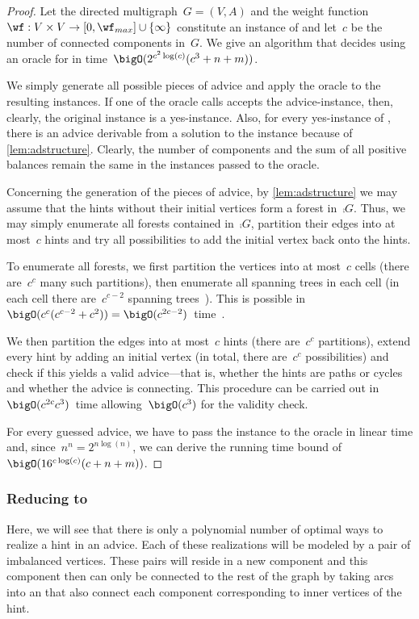 \begin{proof}
  Let the directed multigraph~$G=(V,A)$ and the weight function~$\wf: V \times V \rightarrow [0, \wf_{max}]\cup \{\infty\}$ constitute an instance of \pWMEEs{} and let~$c$ be the number of connected components in~$G$. We give an algorithm that decides \pWMEEs{} using an oracle for \pWMEECAs{} in time~$\bigO(2^{c^2\log(c)}(c^3 + n + m))$.

We simply generate all possible pieces of advice and apply the oracle to the resulting instances. If one of the oracle calls accepts the advice-instance, then, clearly, the original instance is a yes-instance. Also, for every yes-instance of \pWMEEs{}, there is an advice derivable from a solution to the instance because of \autoref{lem:adstructure}. Clearly, the number of components and the sum of all positive balances remain the same in the instances passed to the oracle.

Concerning the generation of the pieces of advice, by \autoref{lem:adstructure} we may assume that the hints without their initial vertices form a forest in~$\comp{G}$. Thus, we may simply enumerate all forests contained in~$\comp{G}$, partition their edges into at most~$c$ hints and try all possibilities to add the initial vertex back onto the hints.

To enumerate all forests, we first partition the vertices into at most~$c$ cells (there are~$c^c$ many such partitions), then enumerate all spanning trees in each cell (in each cell there are~$c^{c-2}$ spanning trees~\cite{Cay89}). This is possible in~$\bigO(c^c(c^{c-2} + c^2)) = \bigO(c^{2c-2})$~time~\cite{KR95}. 

We then partition the edges into at most~$c$ hints (there are~$c^c$ partitions), extend every hint by adding an initial vertex (in total, there are~$c^c$ possibilities) and check if this yields a valid advice---that is, whether the hints are paths or cycles and whether the advice is connecting. This procedure can be carried out in~$\bigO(c^{2c}c^3)$~time allowing~$\bigO(c^3)$ for the validity check.

For every guessed advice, we have to pass the instance to the oracle in linear time and, since~$n^n=2^{n\log(n)}$, we can derive the running time bound of~$\bigO(16^{c\log(c)}(c + n + m))$.
\end{proof}




\subsubsection{Reducing \pWMEEAs{} to \pWMEEs{}} Here, we will see that there is only a polynomial number of optimal ways to realize a hint in an advice. Each of these realizations will be modeled by a pair of imbalanced vertices. These pairs will reside in a new component and this component then can only be connected to the rest of the graph by taking arcs into an \EE{} that also connect each component corresponding to inner vertices of the hint. 


